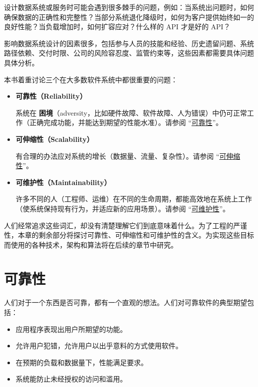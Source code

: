 设计数据系统或服务时可能会遇到很多棘手的问题，例如：当系统出问题时，如何确保数据的正确性和完整性？当部分系统退化降级时，如何为客户提供始终如一的良好性能？当负载增加时，如何扩容应对？什么样的 API 才是好的 API？

影响数据系统设计的因素很多，包括参与人员的技能和经验、历史遗留问题、系统路径依赖、交付时限、公司的风险容忍度、监管约束等，这些因素都需要具体问题具体分析。

本书着重讨论三个在大多数软件系统中都很重要的问题：

\begin{itemize}
  \item \textbf{可靠性（Reliability）}

        系统在 \textbf{困境}（adversity，比如硬件故障、软件故障、人为错误）中仍可正常工作（正确完成功能，并能达到期望的性能水准）。请参阅 “\hyperref[sec:reliability]{可靠性}”。

  \item \textbf{可伸缩性（Scalability）}

        有合理的办法应对系统的增长（数据量、流量、复杂性）。请参阅 “\hyperref[sec:scalability]{可伸缩性}”。

  \item \textbf{可维护性（Maintainability）}

        许多不同的人（工程师、运维）在不同的生命周期，都能高效地在系统上工作（使系统保持现有行为，并适应新的应用场景）。请参阅 “\hyperref[sec:maintainability]{可维护性}”。
\end{itemize}

人们经常追求这些词汇，却没有清楚理解它们到底意味着什么。为了工程的严谨性，本章的剩余部分将探讨可靠性、可伸缩性和可维护性的含义。为实现这些目标而使用的各种技术，架构和算法将在后续的章节中研究。

\section{可靠性}
\label{sec:reliability}

人们对于一个东西是否可靠，都有一个直观的想法。人们对可靠软件的典型期望包括：

\begin{itemize}

  \item 应用程序表现出用户所期望的功能。

  \item 允许用户犯错，允许用户以出乎意料的方式使用软件。

  \item 在预期的负载和数据量下，性能满足要求。

  \item 系统能防止未经授权的访问和滥用。

\end{itemize}

